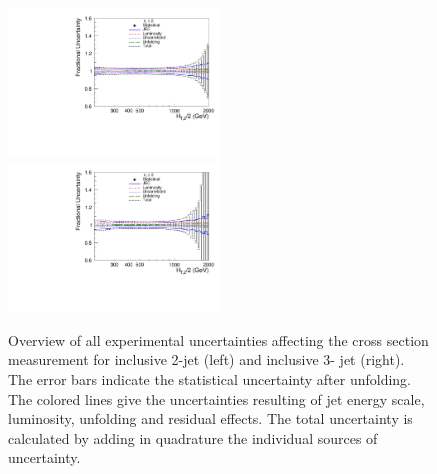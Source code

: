\begin{figure}[!htbp]
  \begin{center}
    \includegraphics[width=0.5\textwidth]{Plots_HT_2_150/Total_unc_all_2_NLO_add.pdf}%
    \includegraphics[width=0.5\textwidth]{Plots_HT_2_150/Total_unc_all_3_NLO_add.pdf}
    \caption{Overview of all experimental uncertainties affecting the cross section measurement for inclusive 2-jet (left) and inclusive 3-
      jet (right). The error bars indicate the statistical uncertainty after unfolding. The colored lines give the uncertainties resulting of 
      jet energy scale, luminosity, unfolding and residual effects. The total uncertainty is calculated by adding in 
      quadrature the individual sources of uncertainty.}
    \label{fig:exp_unc}
  \end{center}
\end{figure}

